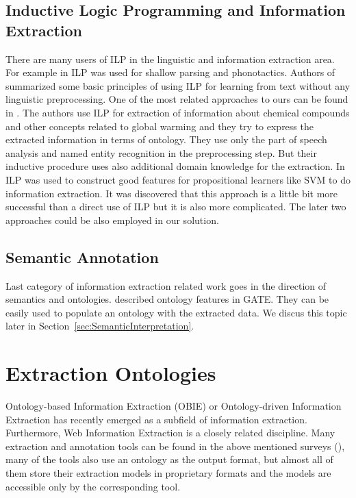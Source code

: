 \subsection{Inductive Logic Programming and Information Extraction}
There are many users of ILP in the linguistic and information extraction area.
For example in \citep{stasinos:phd} ILP was used for shallow parsing and phonotactics.
Authors of \citep{Junker99learningfor} summarized some basic principles of using ILP for learning from text without any linguistic preprocessing. One of the most related approaches to ours can be found in \citep{aitken02:_learn_infor_extrac_rules}. The authors use ILP for extraction of information about chemical compounds and other concepts related to global warming and they try to express the extracted information in terms of ontology. They use only the part of speech analysis and named entity recognition in the preprocessing step. But their inductive procedure uses also additional domain knowledge for the extraction. In \citep{DBLP:conf/ilp/RamakrishnanJBS07} ILP was used to construct good features for propositional learners like SVM to do information extraction. It was discovered that this approach is a little bit more successful than a direct use of ILP but it is also more complicated. The later two approaches could be also employed in our solution.



\subsection{Semantic Annotation}
Last category of information extraction related work goes in the direction of semantics and ontologies. \cite{Bon04b} described  ontology features in GATE. They can be easily used to populate an ontology with the extracted data. We discus this topic later in Section~\ref{sec:SemanticInterpretation}.



\section{Extraction Ontologies} \label{sec:relwork_ext_ont}

Ontology-based Information Extraction (OBIE) \citep{citeulike:7291004} or Ontology-driven Information Extraction \citep{Yildiz:2007:OMO:1793154.1793216} has recently emerged as a subfield of information extraction. Furthermore, Web Information Extraction \citep{biblio:Survey_of_Web_Information_Extraction_Systems} is a closely related discipline. Many extraction and annotation tools can be found in the above mentioned surveys (\citep{biblio:Survey_of_Web_Information_Extraction_Systems}), many of the tools also use an ontology as the output format, but almost all of them store their extraction models in proprietary formats and the models are accessible only by the corresponding tool.

